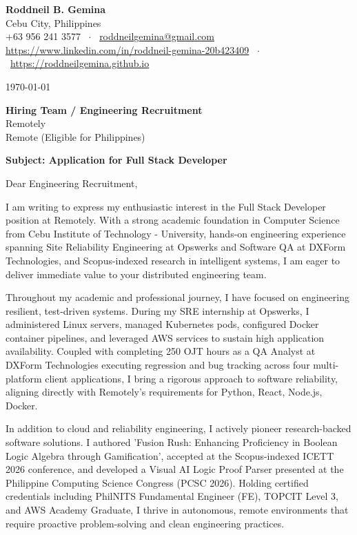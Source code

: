\documentclass[letterpaper,11pt]{article}
\begin{document}
\textbf{Roddneil B. Gemina} \\
Cebu City, Philippines \\
+63 956 241 3577 \ $\cdot$ \ \href{mailto:roddneilgemina@gmail.com}{roddneilgemina@gmail.com} \\
\href{https://www.linkedin.com/in/roddneil-gemina-20b423409}{https://www.linkedin.com/in/roddneil-gemina-20b423409} \ $\cdot$ \ \href{https://roddneilgemina.github.io}{https://roddneilgemina.github.io}

\vspace{12pt}
\today

\vspace{8pt}
\textbf{Hiring Team / Engineering Recruitment} \\
Remotely \\
Remote (Eligible for Philippines)

\vspace{8pt}
\textbf{Subject: Application for Full Stack Developer}

\vspace{4pt}
Dear Engineering Recruitment,

I am writing to express my enthusiastic interest in the Full Stack Developer position at Remotely. With a strong academic foundation in Computer Science from Cebu Institute of Technology - University, hands-on engineering experience spanning Site Reliability Engineering at Opswerks and Software QA at DXForm Technologies, and Scopus-indexed research in intelligent systems, I am eager to deliver immediate value to your distributed engineering team.

Throughout my academic and professional journey, I have focused on engineering resilient, test-driven systems. During my SRE internship at Opswerks, I administered Linux servers, managed Kubernetes pods, configured Docker container pipelines, and leveraged AWS services to sustain high application availability. Coupled with completing 250 OJT hours as a QA Analyst at DXForm Technologies executing regression and bug tracking across four multi-platform client applications, I bring a rigorous approach to software reliability, aligning directly with Remotely's requirements for Python, React, Node.js, Docker.

In addition to cloud and reliability engineering, I actively pioneer research-backed software solutions. I authored 'Fusion Rush: Enhancing Proficiency in Boolean Logic Algebra through Gamification', accepted at the Scopus-indexed ICETT 2026 conference, and developed a Visual AI Logic Proof Parser presented at the Philippine Computing Science Congress (PCSC 2026). Holding certified credentials including PhilNITS Fundamental Engineer (FE), TOPCIT Level 3, and AWS Academy Graduate, I thrive in autonomous, remote environments that require proactive problem-solving and clean engineering practices.
\end{document}
